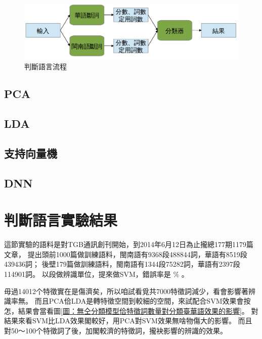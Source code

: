 \documentclass[final,oneside,onecolumn,12pt,a4paper]{book}%
\begin{document}
\begin{figure}
\centerline{\includegraphics[keepaspectratio]{圖/判斷語言架構}}
\caption{判斷語言流程}
\label{圖：判斷語言架構}
\end{figure}

\subsection{PCA}
\label{節：PCA}

\subsection{LDA}
\label{節：LDA}

\subsection{支持向量機}
\label{節：支持向量機}

\subsection{DNN}
\label{節：DNN}


\section{判斷語言實驗結果}
\label{節：判斷語言實驗結果}
這節實驗的語料是對TGB通訊創刊開始，到2014年6月12日為止攏總177期1179篇文章，
提出頭前1000篇做訓練語料，閩南語有9368段488844詞，華語有8519段439436詞；
後壁179篇做訓練語料，閩南語有1344段75282詞，華語有2397段114901詞。
以段做辨識單位，提來做SVM，錯誤率是 $\%$ 。

毋過14012个特徵實在是傷濟矣，所以咱試看覓共7000特徵詞減少，看會影響著辨識率無。
而且PCA佮LDA是轉特徵空間到較細的空間，來試配合SVM效果會按怎，結果會當看圖\ref{圖：無仝分類模型佮特徵詞數量對分類臺華語效果的影響}。
對結果來看SVM比LDA效果閣較好，用PCA對SVM效果無啥物傷大的影響。
而且對50～100个特徵詞了後，加閣較濟的特徵詞，攏袂影響的辨識的效果。
\end{document}
